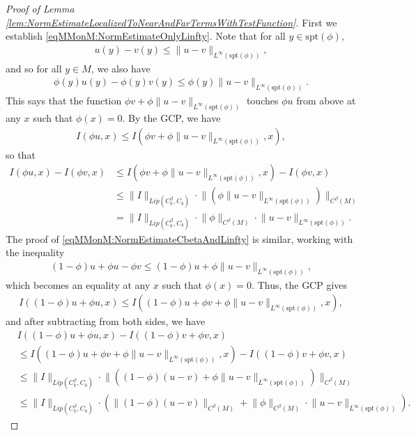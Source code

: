 \documentclass[11pt,reqno]{amsart}
\numberwithin{equation}{section}
\theoremstyle{plain}
\newcommand{\norm}[1]{\lVert#1\rVert}
\begin{document}
\begin{proof}[Proof of Lemma \ref{lem:NormEstimateLocalizedToNearAndFarTermsWithTestFunction}]
	First we establish \eqref{eqMMonM:NormEstimateOnlyLinfty}.  Note that for all $y\in \text{spt}(\phi)$,
	\begin{align*}
		u(y)-v(y)\leq \norm{u-v}_{L^\infty(\text{spt}(\phi))},
	\end{align*}
	 and so for all $y\in M$, we also have 
	\begin{align*}
		\phi(y)u(y)-\phi(y)v(y)\leq \phi(y)\norm{u-v}_{L^\infty(\text{spt}(\phi))}.
	\end{align*}
	This says that the function $\phi v + \phi\norm{u-v}_{L^\infty(\text{spt}(\phi))}$ touches $\phi u$ from above at any $x$ such that $\phi(x)=0$.  By the GCP, we have
	\begin{align*}
		I(\phi u,x)\leq I(\phi v + \phi\norm{u-v}_{L^\infty(\text{spt}(\phi))},x),
	\end{align*}
	so that
	\begin{align*}
		I(\phi u,x) - I(\phi v,x)&\leq I(\phi v + \phi\norm{u-v}_{L^\infty(\text{spt}(\phi))},x) - I(\phi v,x)\\
		&\leq \norm{I}_{Lip(C^\beta_b,C_b)} \cdot \norm{\left(\phi\norm{u-v}_{L^\infty(\text{spt}(\phi))}\right)}_{C^\beta(M)}\\
		&= \norm{I}_{Lip(C^\beta_b,C_b)} \cdot \norm{\phi}_{C^\beta(M)}\cdot \norm{u-v}_{L^\infty(\text{spt}(\phi))}.
	\end{align*}
	The proof of \eqref{eqMMonM:NormEstimateCbetaAndLinfty} is similar, working with the inequality
	\begin{align*}
		(1-\phi)u+\phi u - \phi v
		\leq (1-\phi)u + \phi\norm{u-v}_{L^\infty(\text{spt}(\phi))},
	\end{align*}
	which becomes an equality at any $x$ such that $\phi(x)=0$.  Thus, the GCP gives
	\begin{align*}
		I((1-\phi)u+\phi u,x)
		\leq I((1-\phi)u + \phi v + \phi\norm{u-v}_{L^\infty(\text{spt}(\phi))},x),
	\end{align*}
	and after subtracting from both sides, we have
	\begin{align*}
		&I((1-\phi)u+\phi u,x) - I((1-\phi)v+\phi v,x)\\
		&\leq I((1-\phi)u + \phi v + \phi\norm{u-v}_{L^\infty(\text{spt}(\phi))},x)
		- I((1-\phi)v+\phi v,x)\\
		&\leq \norm{I}_{Lip(C^\beta_b,C_b)} \cdot \norm{\left((1-\phi)(u-v)+\phi\norm{u-v}_{L^\infty(\text{spt}(\phi))}\right)}_{C^\beta(M)}\\
		&\leq \norm{I}_{Lip(C^\beta_b,C_b)} \cdot\left( \norm{(1-\phi)(u-v)}_{C^\beta(M)} + \norm{\phi}_{C^\beta(M)}\cdot \norm{u-v}_{L^\infty(\text{spt}(\phi))} \right).
	\end{align*}
\end{proof}
\end{document}
